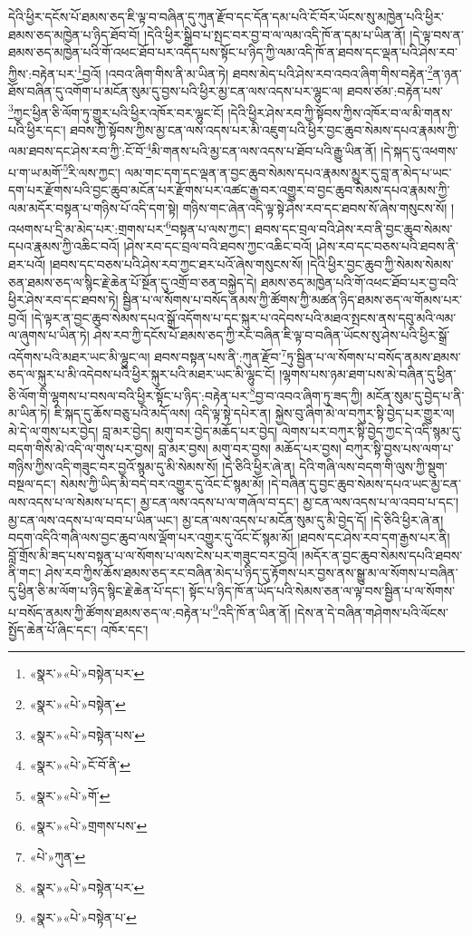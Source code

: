 དེའི་ཕྱིར་དངོས་པོ་ཐམས་ཅད་ཇི་ལྟ་བ་བཞིན་དུ་ཀུན་རྫོབ་དང་དོན་དམ་པའི་ངོ་བོར་ཡོངས་སུ་མཁྱེན་པའི་ཕྱིར་ཐམས་ཅད་མཁྱེན་པ་ཉིད་ཐོབ་བོ། །དེའི་ཕྱིར་སྒྲིབ་པ་སྤང་བར་བྱ་བ་ལ་ལམ་འདི་ཁོ་ན་དམ་པ་ཡིན་ནོ། །དེ་ལྟ་བས་ན་ཐམས་ཅད་མཁྱེན་པའི་གོ་འཕང་ཐོབ་པར་འདོད་པས་སྟོང་པ་ཉིད་ཀྱི་ལམ་འདི་ཁོ་ན་ཐབས་དང་ལྡན་པའི་ཤེས་རབ་ཀྱིས་:བརྟེན་པར་\footnote{«སྣར་»«པེ་»བསྟེན་པར་}བྱའོ། །འབའ་ཞིག་གིས་ནི་མ་ཡིན་ཏེ། ཐབས་མེད་པའི་ཤེས་རབ་འབའ་ཞིག་གིས་བརྟེན་\footnote{«སྣར་»«པེ་»བསྟེན་}ན་ཉན་ཐོས་བཞིན་དུ་འགོག་པ་མངོན་སུམ་དུ་བྱས་པའི་ཕྱིར་མྱ་ངན་ལས་འདས་པར་ལྷུང་ལ། ཐབས་ཙམ་:བརྟེན་པས་\footnote{«སྣར་»«པེ་»བསྟེན་པས་}ཀྱང་ཕྱིན་ཅི་ལོག་ཏུ་གྱུར་པའི་ཕྱིར་འཁོར་བར་ལྷུང་ངོ། །དེའི་ཕྱིར་ཤེས་རབ་ཀྱི་སྟོབས་ཀྱིས་འཁོར་བ་ལ་མི་གནས་པའི་ཕྱིར་དང་། ཐབས་ཀྱི་སྟོབས་ཀྱིས་མྱ་ངན་ལས་འདས་པར་མི་འཇུག་པའི་ཕྱིར་བྱང་ཆུབ་སེམས་དཔའ་རྣམས་ཀྱི་ལམ་ཐབས་དང་ཤེས་རབ་ཀྱི་:ངོ་བོ་\footnote{«སྣར་»«པེ་»ངོ་བོ་ནི་}མི་གནས་པའི་མྱ་ངན་ལས་འདས་པ་ཐོབ་པའི་རྒྱུ་ཡིན་ནོ། །དེ་སྐད་དུ་འཕགས་པ་ག་ཡ་མགོ་\footnote{«སྣར་»«པེ་»གོ་}རི་ལས་ཀྱང་། ལམ་གང་དག་དང་ལྡན་ན་བྱང་ཆུབ་སེམས་དཔའ་རྣམས་མྱུར་དུ་བླ་ན་མེད་པ་ཡང་དག་པར་རྫོགས་པའི་བྱང་ཆུབ་མངོན་པར་རྫོགས་པར་འཚང་རྒྱ་བར་འགྱུར་བ་བྱང་ཆུབ་སེམས་དཔའ་རྣམས་ཀྱི་ལམ་མདོར་བསྟན་པ་གཉིས་པོ་འདི་དག་སྟེ། གཉིས་གང་ཞེན་འདི་ལྟ་སྟེ་ཤེས་རབ་དང་ཐབས་སོ་ཞེས་གསུངས་སོ། །འཕགས་པ་དྲི་མ་མེད་པར་:གྲགས་པར་\footnote{«སྣར་»«པེ་»གྲགས་པས་}བསྟན་པ་ལས་ཀྱང་། ཐབས་དང་བྲལ་བའི་ཤེས་རབ་ནི་བྱང་ཆུབ་སེམས་དཔའ་རྣམས་ཀྱི་འཆིང་བའོ། །ཤེས་རབ་དང་བྲལ་བའི་ཐབས་ཀྱང་འཆིང་བའོ། །ཤེས་རབ་དང་བཅས་པའི་ཐབས་ནི་ཐར་པའོ། །ཐབས་དང་བཅས་པའི་ཤེས་རབ་ཀྱང་ཐར་པའོ་ཞེས་གསུངས་སོ། །དེའི་ཕྱིར་བྱང་ཆུབ་ཀྱི་སེམས་སེམས་ཅན་ཐམས་ཅད་ལ་སྙིང་རྗེ་ཆེན་པོ་སྔོན་དུ་འགྲོ་བ་ཅན་བསྐྱེད་དེ། ཐམས་ཅད་མཁྱེན་པའི་གོ་འཕང་ཐོབ་པར་བྱ་བའི་ཕྱིར་ཤེས་རབ་དང་ཐབས་ཏེ། སྦྱིན་པ་ལ་སོགས་པ་བསོད་ནམས་ཀྱི་ཚོགས་ཀྱི་མཚན་ཉིད་ཐམས་ཅད་ལ་གོམས་པར་བྱའོ། །དེ་ལྟར་ན་བྱང་ཆུབ་སེམས་དཔའ་སྒྲོ་འདོགས་པ་དང་སྐུར་པ་འདེབས་པའི་མཐའ་སྤངས་ནས་དབུ་མའི་ལམ་ལ་ཞུགས་པ་ཡིན་ཏེ། ཤེས་རབ་ཀྱི་དངོས་པོ་ཐམས་ཅད་ཀྱི་རང་བཞིན་ཇི་ལྟ་བ་བཞིན་ཡོངས་སུ་ཤེས་པའི་ཕྱིར་སྒྲོ་འདོགས་པའི་མཐར་ཡང་མི་ལྷུང་ལ། ཐབས་བསྟན་པས་ནི་:ཀུན་རྫོབ་\footnote{«པེ་»ཀུན་}ཏུ་སྦྱིན་པ་ལ་སོགས་པ་བསོད་ནམས་ཐམས་ཅད་ལ་སྐུར་པ་མི་འདེབས་པའི་ཕྱིར་སྐུར་པའི་མཐར་ཡང་མི་ལྷུང་ངོ། །ལྷགས་པས་ཉམ་ཐག་པས་མེ་བཞིན་དུ་ཕྱིན་ཅི་ལོག་གི་ལྷགས་པ་བསལ་བའི་ཕྱིར་སྟོང་པ་ཉིད་:བརྟེན་པར་\footnote{«སྣར་»«པེ་»བསྟེན་པར་}བྱ་བ་འབའ་ཞིག་ཏུ་ཟད་ཀྱི། མངོན་སུམ་དུ་བྱེད་པ་ནི་མ་ཡིན་ཏེ། ཇི་སྐད་དུ་ཆོས་བཅུ་པའི་མདོ་ལས། འདི་ལྟ་སྟེ་དཔེར་ན། སྐྱེས་བུ་ཞིག་མེ་ལ་བཀུར་སྟི་བྱེད་པར་གྱུར་ལ། མེ་དེ་ལ་གུས་པར་བྱེད། བླ་མར་བྱེད། མགུ་བར་བྱེད་མཆོད་པར་བྱེད། ལེགས་པར་བཀུར་སྟི་བྱེད་ཀྱང་དེ་འདི་སྙམ་དུ་བདག་གིས་མེ་འདི་ལ་གུས་པར་བྱས། བླ་མར་བྱས། མགུ་བར་བྱས། མཆོད་པར་བྱས། བཀུར་སྟི་བྱས་པས་ལག་པ་གཉིས་ཀྱིས་འདི་གཟུང་བར་བྱའོ་སྙམ་དུ་མི་སེམས་སོ། །དེ་ཅིའི་ཕྱིར་ཞེ་ན། དེའི་གཞི་ལས་བདག་གི་ལུས་ཀྱི་སྡུག་བསྔལ་དང་། སེམས་ཀྱི་ཡིད་མི་བདེ་བར་འགྱུར་དུ་འོང་ངོ་སྙམ་མོ། །དེ་བཞིན་དུ་བྱང་ཆུབ་སེམས་དཔའ་ཡང་མྱ་ངན་ལས་འདས་པ་ལ་སེམས་པ་དང་། མྱ་ངན་ལས་འདས་པ་ལ་གཞོལ་བ་དང་། མྱ་ངན་ལས་འདས་པ་ལ་འབབ་པ་དང་། མྱ་ངན་ལས་འདས་པ་ལ་བབ་པ་ཡིན་ཡང་། མྱ་ངན་ལས་འདས་པ་མངོན་སུམ་དུ་མི་བྱེད་དོ། །དེ་ཅིའི་ཕྱིར་ཞེ་ན། བདག་འདིའི་གཞི་ལས་བྱང་ཆུབ་ལས་ལྡོག་པར་འགྱུར་དུ་འོང་ངོ་སྙམ་མོ། །ཐབས་དང་ཤེས་རབ་དག་རྒྱས་པར་ནི། བློ་གྲོས་མི་ཟད་པས་བསྟན་པ་ལ་སོགས་པ་ལས་ངེས་པར་གཟུང་བར་བྱའོ། །མདོར་ན་བྱང་ཆུབ་སེམས་དཔའི་ཐབས་ནི་གང་། ཤེས་རབ་ཀྱིས་ཆོས་ཐམས་ཅད་རང་བཞིན་མེད་པ་ཉིད་དུ་རྟོགས་པར་བྱས་ནས་སྒྱུ་མ་ལ་སོགས་པ་བཞིན་དུ་ཕྱིན་ཅི་མ་ལོག་པ་ཉིད་སྙིང་རྗེ་ཆེན་པོ་དང་། སྟོང་པ་ཉིད་ཁོ་ན་ཡོད་པའི་སེམས་ཅན་ལ་ལྟ་བས་སྦྱིན་པ་ལ་སོགས་པ་བསོད་ནམས་ཀྱི་ཚོགས་ཐམས་ཅད་ལ་:བརྟེན་པ་\footnote{«སྣར་»«པེ་»བསྟེན་པ་}འདི་ཁོ་ན་ཡིན་ནོ། །དེས་ན་དེ་བཞིན་གཤེགས་པའི་ལོངས་སྤྱོད་ཆེན་པོ་ཞིང་དང་། འཁོར་དང་། 